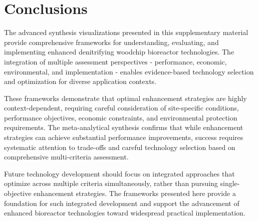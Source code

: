 \documentclass[12pt,a4paper]{article}
\begin{document}
\section{Conclusions}

The advanced synthesis visualizations presented in this supplementary material provide comprehensive frameworks for understanding, evaluating, and implementing enhanced denitrifying woodchip bioreactor technologies. The integration of multiple assessment perspectives - performance, economic, environmental, and implementation - enables evidence-based technology selection and optimization for diverse application contexts.

These frameworks demonstrate that optimal enhancement strategies are highly context-dependent, requiring careful consideration of site-specific conditions, performance objectives, economic constraints, and environmental protection requirements. The meta-analytical synthesis confirms that while enhancement strategies can achieve substantial performance improvements, success requires systematic attention to trade-offs and careful technology selection based on comprehensive multi-criteria assessment.

Future technology development should focus on integrated approaches that optimize across multiple criteria simultaneously, rather than pursuing single-objective enhancement strategies. The frameworks presented here provide a foundation for such integrated development and support the advancement of enhanced bioreactor technologies toward widespread practical implementation.
\end{document}
